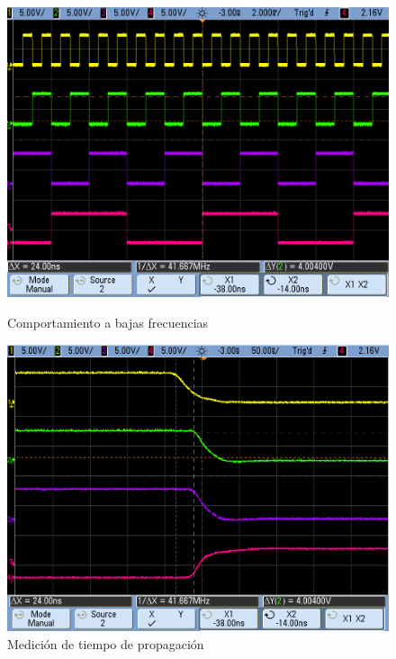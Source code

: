 \begin{figure}[H]
\begin{center}
  \begin{minipage}[b]{0.4\textwidth}
  	\begin{center}
  		\includegraphics[scale=0.15]{ejercicio7/imagenes/sync25.png}
  	\end{center}
  \caption{Comportamiento a bajas frecuencias}
  \label{7_fig8}
  \end{minipage}
  \begin{minipage}[b]{0.4\textwidth}
    \begin{center}
  		\includegraphics[scale=0.15]{ejercicio7/imagenes/sync24.png}
	\end{center}
  \caption{Medici\'on de tiempo de propagaci\'on}
  \label{7_fig9}
 \end{minipage}
\end{center}
\end{figure}

